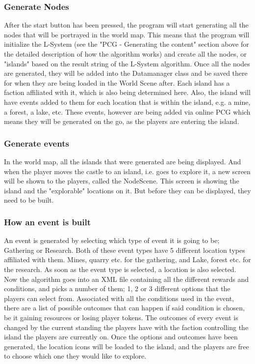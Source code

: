 \subsubsection{Generate Nodes}
After the start button has been pressed, the program will start generating all the nodes that will be portrayed in the world map. This means that the program will initialize the L-System (see the "PCG - Generating the content" section above for the detailed description of how the algorithm works) and create all the nodes, or "islands" based on the result string of the L-System algorithm. Once all the nodes are generated, they will be added into the Datamanager class and be saved there for when they are being loaded in the World Scene after. 
Each island has a faction affiliated with it, which is also being determined here. Also, the island will have events added to them for each location that is within the island, e.g. a mine, a forest, a lake, etc. These events, however are being added via online PCG which means they will be generated on the go, as the players are entering the island.

\subsubsection{Generate events}
In the world map, all the islands that were generated are being displayed. And when the player moves the castle to an island, i.e. goes to explore it, a new screen will be shown to the players, called the NodeScene. This screen is showing the island and the "explorable" locations on it. But before they can be displayed, they need to be built. 

\subsubsection{How an event is built}
An event is generated by selecting which type of event it is going to be; Gathering or Research. Both of these event types have 5 different location types affiliated with them. Mines, quarry etc. for the gathering, and Lake, forest etc. for the research. As soon as the event type is selected, a location is also selected. Now the algorithm goes into an XML file containing all the different rewards and conditions, and picks a number of them; 1, 2 or 3 different options that the players can select from. Associated with all the conditions used in the event, there are a list of possible outcomes that can happen if said condition is chosen, be it gaining resources or losing player tokens. The outcomes of every event is changed by the current standing the players have with the faction controlling the island the players are currently on. 
Once the options and outcomes have been generated, the location icons will be loaded to the island, and the players are free to choose which one they would like to explore.

